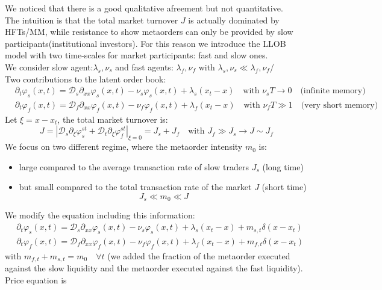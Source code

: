 We noticed that there is a good qualitative afreement but not quantitative.\\
The intuition is that the total market turnover $J$ is actually dominated by HFTs/MM, while resistance to show metaorders can only be provided by slow participants(institutional investors). For this reason we introduce the LLOB model with two time-scales for market participants: fast and slow ones.\\
We consider slow agent:$\lambda_s, \nu_s$ and fast agents: $\lambda_f,\nu_f$ with $\lambda_s,\nu_s \ll \lambda_f,\nu_f$/\\
Two contributions to the latent order book:
\begin{align*}
	&\partial_t \varphi_s(x,t) = \mathcal{D}_s \partial_{xx} \varphi_s(x,t) - \nu_s \varphi_s(x,t) + \lambda_s(x_t -x) \quad \text{with } \nu_sT \to 0 \quad \text{(infinite memory)}\\
	&\partial_t \varphi_f(x,t) = \mathcal{D}_f \partial_{xx} \varphi_f(x,t) - \nu_f \varphi_f(x,t) + \lambda_f(x_t -x) \quad \text{with } \nu_fT \gg 1 \quad \text{(very short memory)}
\end{align*}
Let $\xi = x -x_t$, the total market turnover is:
\[
J = |\mathcal{D}_s \partial_\xi \varphi_s^{st} + \mathcal{D}_t\partial_\xi \varphi_f^{st}|_{\xi =0} =J_s +J_f \quad \text{with } J_f \gg J_s\to J \sim J_f
\]
We focus on two different regime, where the metaorder intensity $m_0$ is:
\begin{itemize}
	\item large compared to the average transaction rate of slow traders $J_s$ (long time)\\
	\item but small compared to the total transaction rate of the market $J$ (short time)
	\[
	J_s \ll m_0 \ll J
	\]
\end{itemize}
We modify the equation including this information:
\begin{align*}
	&\partial_t \varphi_s(x,t) = \mathcal{D}_s \partial_{xx} \varphi_s(x,t) - \nu_s \varphi_s(x,t) + \lambda_s(x_t -x) + m_{s,t}\delta(x-x_t)\\
	&\partial_t \varphi_f(x,t) = \mathcal{D}_f \partial_{xx} \varphi_f(x,t) - \nu_f \varphi_f(x,t) + \lambda_f(x_t -x) + m_{f,t} \delta(x-x_t)
\end{align*}
with $m_{f,t} + m_{s,t} =m_0 \quad \forall t$ (we added the fraction of the metaorder executed against the slow liquidity and the metaorder executed against the fast liquidity).\\
Price equation is
